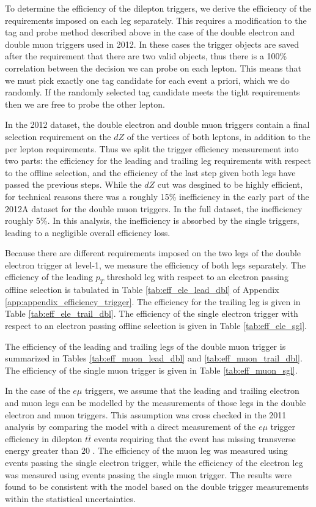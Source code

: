  
To determine the efficiency of the dilepton triggers, 
we derive the efficiency of the requirements imposed on each leg separately.
This requires a modification to the tag and probe method described above in 
the case of the double electron and double muon triggers used in 2012.
In these cases the trigger objects are saved after the requirement that there are two valid objects, 
thus there is a 100\% correlation between the decision we can probe on each lepton.
This means that we must pick exactly one tag candidate for each event a priori, which we do 
randomly. 
If the randomly selected tag candidate meets the tight requirements then we are free to 
probe the other lepton.

In the 2012 dataset, the double electron and double muon triggers contain 
a final selection requirement on the $dZ$ of the vertices of both leptons, 
in addition to the per lepton requirements.  Thus we split the trigger efficiency 
measurement into two parts: the efficiency for the leading and trailing leg 
requirements with respect to the offline selection, and the efficiency of the 
last step given both legs have passed the previous steps.
While the $dZ$ cut was desgined to be highly efficient,
for technical reasons there was a roughly 15\% inefficiency in
the early part of the 2012A dataset for the double muon triggers.
In the full dataset, the inefficiency roughly 5\%.
In this analysis, the inefficiency is absorbed by the single triggers, 
leading to a negligible overall efficiency loss.

Because there are different requirements imposed on the two legs of the 
double electron trigger at level-1, we measure the efficiency of 
both legs separately.
The efficiency of the leading $p_T$ threshold leg with respect to an electron passing
offline selection is tabulated in 
Table \ref{tab:eff_ele_lead_dbl} of Appendix 
\ref{app:appendix_efficiency_trigger}. The efficiency for the trailing 
leg is given in Table \ref{tab:eff_ele_trail_dbl}. 
The efficiency of the single electron trigger with respect to
an electron passing offline selection is given in Table \ref{tab:eff_ele_sgl}.

The efficiency of the leading and trailing legs of the double muon trigger
is summarized in Tables \ref{tab:eff_muon_lead_dbl} and
\ref{tab:eff_muon_trail_dbl}. The efficiency of the single
muon trigger is given in Table \ref{tab:eff_muon_sgl}.

In the case of the $e\mu$ triggers, we assume that the leading
and trailing electron and muon legs can be modelled by the measurements
of those legs in the double electron and muon triggers. This assumption was cross 
checked in the 2011 analysis by comparing the model with
a direct measurement of the $e\mu$ trigger efficiency in
dilepton $t\bar{t}$ events requiring that the event has missing transverse
energy greater than $20$ \GeV.
The efficiency of 
the muon leg was measured using events passing the single electron trigger,
while the efficiency of the electron leg was measured using events passing the
single muon trigger. The results were found to be consistent
with the model based on the double trigger measurements within the 
statistical uncertainties. 

